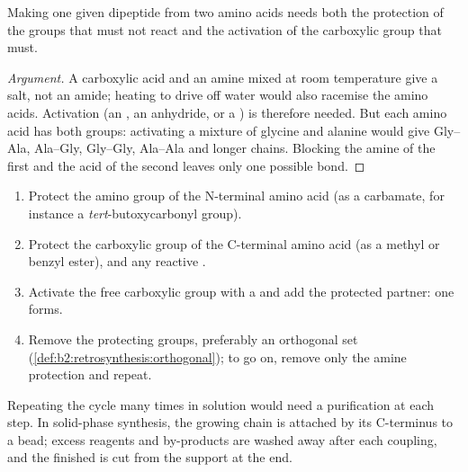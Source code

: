 \begin{proposition}\label{prop:b2:biomolecules:coupling}
Making one given dipeptide from two amino acids needs both the protection of the groups that must not
react and the activation of the carboxylic group that must.
\end{proposition}

\begin{proof}[Argument]
A carboxylic acid and an amine mixed at room temperature give a salt, not an amide; heating to drive off
water would also racemise the amino acids. Activation (an , an anhydride, or a ) is therefore needed. But each amino acid has both groups: activating a mixture of glycine and
alanine would give Gly--Ala, Ala--Gly, Gly--Gly, Ala--Ala and longer chains. Blocking the amine of the
first and the acid of the second leaves only one possible bond.
\end{proof}

\begin{method}\label{met:b2:biomolecules:peptide}
\begin{enumerate}
  \item Protect the amino group of the N-terminal amino acid (as a carbamate, for instance a
        \textit{tert}-butoxycarbonyl group).
  \item Protect the carboxylic group of the C-terminal amino acid (as a methyl or benzyl ester), and any
        reactive .
  \item Activate the free carboxylic group with a  and add the protected partner: one
         forms.
  \item Remove the protecting groups, preferably an orthogonal set
        (\cref{def:b2:retrosynthesis:orthogonal}); to go on, remove only the amine protection and repeat.
\end{enumerate}
\end{method}

Repeating the cycle many times in solution would need a purification at each step. In solid-phase
synthesis, the growing chain is attached by its C-terminus to a  bead; excess reagents and
by-products are washed away after each coupling, and the finished  is cut from the support at
the end.

